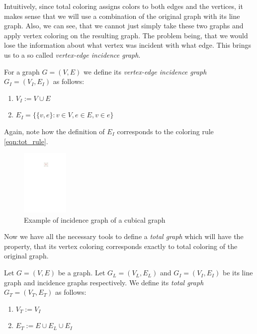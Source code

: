 Intuitively, since total coloring assigns colors to both edges and the vertices, it makes sense that we will use a combination of the original graph with its line graph. Also, we can see, that we cannot just simply take these two graphs and apply vertex coloring on the resulting graph. The problem being, that we would lose the information about what vertex was incident with what edge. This brings us to a so called \textit{vertex-edge incidence graph}.

\begin{definition}
    For a graph $G=(V,E)$ we define its \textit{vertex-edge incidence graph} $G_I=(V_I,E_I)$ as follows:
    \begin{enumerate}
        \item $V_I := V \cup E$
        \item $E_I = \{\{v,e\} : v \in V, e \in E, v \in e \}$
    \end{enumerate}
\end{definition}

Again, note how the definition of $E_I$ corresponds to the coloring rule \ref{eqn:tot_rule}.

\begin{figure}[H]
    \centering
    \includegraphics[width=0.2\textwidth]{../Resources/Figs/cubical_incid_graph.pdf}
    \caption{Example of incidence graph of a cubical graph}
    \label{fig:cubical_incid_graph}
\end{figure}

Now we have all the necessary tools to define a \textit{total graph} which will have the property, that its vertex coloring corresponds exactly to total coloring of the original graph.

\begin{definition}
    Let $G=(V,E)$ be a graph. Let $G_L =(V_L,E_L)$ and $G_I=(V_I,E_I)$ be its line graph and incidence graphs respectively. We define its \textit{total graph} $G_T=(V_T,E_T)$ as follows:
    \begin{enumerate}
        \item $V_T := V_I$
        \item $E_T := E \cup E_L \cup E_I$
    \end{enumerate}
\end{definition}

